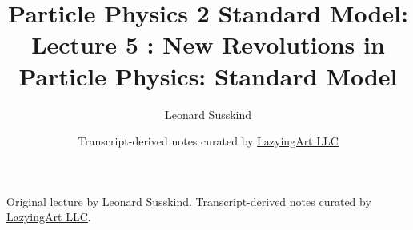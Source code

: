 \documentclass[11pt,oneside]{book}
\begin{document}
\frontmatter
\title{Particle Physics 2 Standard Model: Lecture 5 : New Revolutions in Particle Physics: Standard Model}
\author{Leonard Susskind}
\date{Transcript-derived notes curated by \href{https://lazying.art}{LazyingArt LLC}}
\maketitle
\begin{center}
\small Original lecture by Leonard Susskind. Transcript-derived notes curated by \href{https://lazying.art}{LazyingArt LLC}.
\end{center}
\clearpage
\mainmatter

\end{document}

